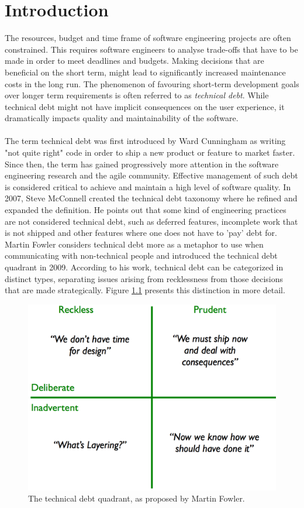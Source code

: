 \chapter{Introduction}


The resources, budget and time frame of software engineering projects are often constrained.
This requires software engineers to analyse trade-offs that have to be made in order to meet deadlines and budgets.
Making decisions that are beneficial on the short term, might lead to significantly increased maintenance costs in the long run.
The phenomenon of favouring short-term development goals over longer term requirements is often referred to as \emph{technical debt}.
While technical debt might not have implicit consequences on the user experience, it dramatically impacts quality and maintainability of the software.\\\\
The term technical debt was first introduced by Ward Cunningham as writing "not quite right" code in order to ship a new product or feature to market faster\cite{cunningham1993wycash}.
Since then, the term has gained progressively more attention in the software engineering research and the agile community.
Effective management of such debt is considered critical to achieve and maintain a high level of software quality.
In 2007, Steve McConnell created the technical debt taxonomy where he refined and expanded the definition\cite{mcconnell2007debt}.
He points out that some kind of engineering practices are not considered technical debt, such as deferred features, incomplete work that is not shipped and other features where one does not have to 'pay' debt for.
Martin Fowler considers technical debt more as a metaphor to use when communicating with non-technical people and introduced the technical debt quadrant in 2009\cite{technicaldebtquadrant}.
According to his work, technical debt can be categorized in distinct types, separating issues arising from recklessness from those decisions that are made strategically. 
Figure \ref{fig:technical-debt-quadrant} presents this distinction in more detail.\\

\begin{figure}[!h]
	\centering
	\includegraphics[width=0.5\columnwidth]{images/introduction/technical_debt_quadrant}
	\caption{The technical debt quadrant, as proposed by Martin Fowler.}
	\label{fig:technical-debt-quadrant}
\end{figure}

